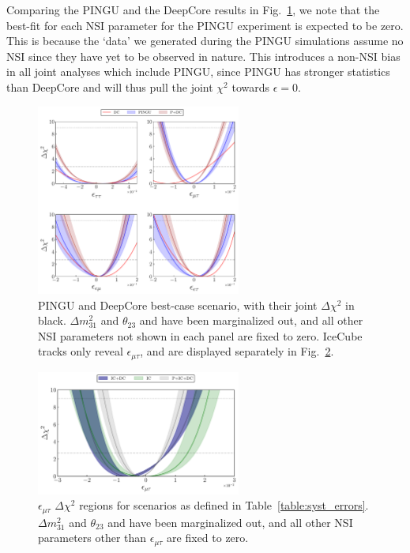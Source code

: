 \documentclass[draft=True]{revtex4-2}
\newcommand{\emt}{\ensuremath{\epsilon_{\mu\tau}}}
\newcommand{\dm}{\Delta m^2_{31}}
\begin{document}
{Comparing the PINGU and the DeepCore results in Fig.~\ref{fig:3D_NO}, we note that the best-fit for each NSI parameter for the PINGU experiment is expected to be zero. This is because the `data' we generated during 
the PINGU simulations assume no NSI since they have yet to be observed in nature. This introduces a non-NSI bias in all joint analyses which include PINGU,
since PINGU has stronger statistics than DeepCore and will thus pull the joint $\chi^2$ towards $\epsilon =0$.

\begin{figure}
   \begin{center}
      \includegraphics[width=0.6\textwidth]{figures/joint_3D_NO.pdf}
      \caption{PINGU and DeepCore best-case scenario, with their joint $\Delta \chi^2$ in black. $\dm$ and $\theta_{23}$ and have been marginalized out, and all other NSI 
      parameters not shown in each panel are fixed to zero. 
      IceCube tracks only reveal $\emt$, and are displayed separately in Fig.~\ref{fig:IC_3D}.}\label{fig:3D_NO}
   \end{center}
\end{figure} 
\begin{figure}
   \begin{center} 
      \includegraphics[width=0.6\textwidth]{figures/PID_3D_emt.pdf}
      \caption{$\emt$ $\Delta \chi^2$ regions for scenarios as defined in Table~\ref{table:syst_errors}.
    $\dm$ and $\theta_{23}$ and have been marginalized out, and all other NSI 
    parameters other than $\emt$ are fixed to zero.}\label{fig:IC_3D}
   \end{center}
\end{figure}



}
\end{document}
